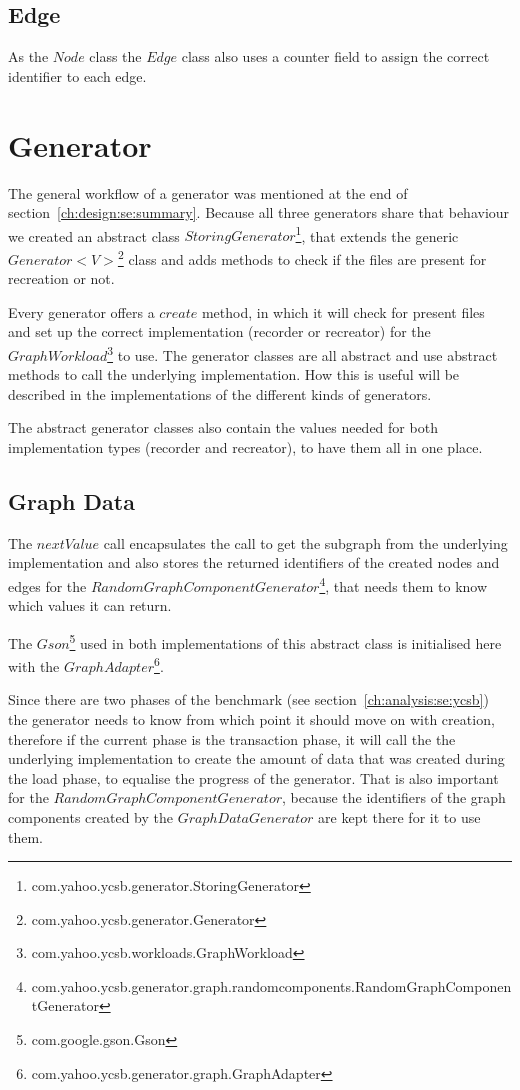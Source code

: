 \subsection{Edge}
As the $ Node $ class the $ Edge $ class also uses a counter field to assign the correct identifier to each edge.

\section{Generator}
\label{ch:implementation:se:generator}
The general workflow of a generator was mentioned at the end of section~\ref{ch:design:se:summary}.
Because all three generators share that behaviour we created an abstract class $ StoringGenerator $\footnote{com.yahoo.ycsb.generator.StoringGenerator},
that extends the generic $ Generator<V> $\footnote{com.yahoo.ycsb.generator.Generator} class and adds methods to check if the files are present for recreation or not.

Every generator offers a $ create $ method,
in which it will check for present files and set up the correct implementation (recorder or recreator) for the $ GraphWorkload $\footnote{com.yahoo.ycsb.workloads.GraphWorkload} to use.
The generator classes are all abstract and use abstract methods to call the underlying implementation.
How this is useful will be described in the implementations of the different kinds of generators.

The abstract generator classes also contain the values needed for both implementation types (recorder and recreator),
to have them all in one place.

\subsection{Graph Data}
The $ nextValue $ call encapsulates the call to get the subgraph from the underlying implementation and also stores the returned identifiers of the created nodes and edges for the $ RandomGraphComponentGenerator $\footnote{com.yahoo.ycsb.generator.graph.randomcomponents.RandomGraphComponentGenerator},
that needs them to know which values it can return.

The $ Gson $\footnote{com.google.gson.Gson} used in both implementations of this abstract class is initialised here with the $ GraphAdapter $\footnote{com.yahoo.ycsb.generator.graph.GraphAdapter}.

Since there are two phases of the benchmark (see section~\ref{ch:analysis:se:ycsb}) the generator needs to know from which point it should move on with creation,
therefore if the current phase is the transaction phase,
it will call the the underlying implementation to create the amount of data that was created during the load phase,
to equalise the progress of the generator.
That is also important for the $ RandomGraphComponentGenerator $,
because the identifiers of the graph components created by the $ GraphDataGenerator $ are kept there for it to use them.

